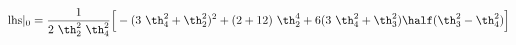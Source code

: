 \begin{equation}
    {\rm lhs}|_0 = {1\over 2~\th_2^2 ~\th_4^2} \Big[
-(3~\th_4^2+\th_2^2)^2 +(2+12)~ \th_2^4 +6(3~\th_4^2+\th_3^2)
\half (\th_3^2-\th_4^2) \Big] 
  \end{equation}

